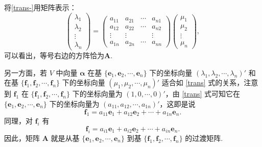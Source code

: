 \documentclass[12pt, a4paper,newtx]{ctexart}
\begin{document}
将\eqref{trans-}用矩阵表示：\begin{equation}\label{transmatrix}
	\begin{pmatrix}
		\lambda_1\\\lambda_2\\\vdots\\\lambda_n
	\end{pmatrix}=\begin{pmatrix}
		a_{11}&a_{21}&\cdots&a_{n1}\\a_{12}&a_{22}&\cdots&a_{n2}\\\vdots&\vdots&&\vdots\\a_{1n}&a_{2n}&\cdots&a_{nn}
	\end{pmatrix}\begin{pmatrix}
		\mu_1\\\mu_2\\\vdots\\\mu_n
	\end{pmatrix},
\end{equation}可以看出，等号右边的方阵恰为$\bm A.$

另一方面，若 $ V $ 中向量 $ \bm\alpha $ 在基 $ \{ \bm e_1, \bm e_2, \cdots, \bm e_n \} $ 下的坐标向量 $ (\lambda_1, \lambda_2, \cdots, \lambda_n)' $ 和在基 $ \{ \bm f_1, \bm f_2, \cdots, \bm f_n \} $ 下的坐标向量 $ (\mu_1, \mu_2, \cdots, \mu_n)' $ 适合如 \eqref{trans} 式的关系，注意到 $ \bm f_1 $ 在 $ \{ \bm f_1, \bm f_2, \cdots, \bm f_n \} $ 下的坐标向量为 $ (1, 0, \cdots, 0)' $，由 \eqref{trans} 式可知它在 $ \{ \bm e_1, \bm e_2, \cdots, \bm e_n \} $ 下的坐标向量为 $ (a_{11}, a_{12}, \cdots, a_{1n})' $，这即是说
\[
\bm f_1 = a_{11} \bm e_1 + a_{12} \bm e_2 + \cdots + a_{1n} \bm e_n.
\]
同理，对 $\bm f_i $ 有
\[
\bm f_i = a_{i1}\bm e_1 + a_{i2} \bm e_2 + \cdots + a_{in} \bm e_n.
\]
因此，矩阵 $ \bm A $ 就是从基 $ \{ \bm e_1, \bm e_2, \cdots, \bm e_n \} $ 到基 $ \{ \bm f_1, \bm f_2, \cdots, \bm f_n \} $ 的过渡矩阵.
\end{document}

